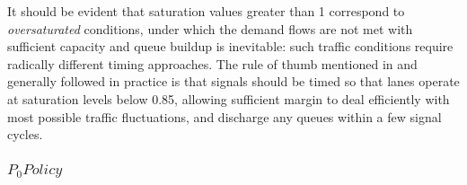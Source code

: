 It should be evident that saturation values greater than 1 correspond to \emph{oversaturated}
conditions, under which the demand flows are not met with sufficient capacity and queue
buildup is inevitable: such traffic conditions require radically different timing approaches.
The rule of thumb mentioned in  and generally followed in practice is that
signals should be timed so that lanes operate at saturation levels below 0.85, allowing sufficient margin to deal efficiently with most possible traffic fluctuations, and discharge any queues within a few signal cycles.

\subsubsection*{$P_0 Policy$}

